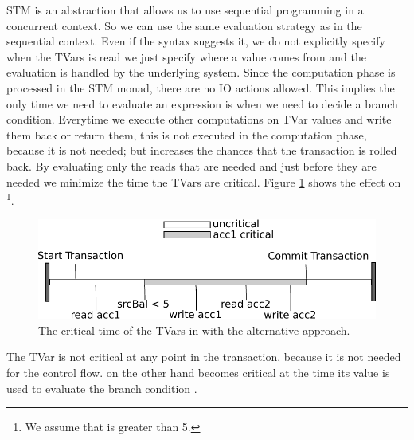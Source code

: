 STM is an abstraction that allows us to use sequential programming in a concurrent context. So we can use the 
same evaluation strategy as in the sequential context. Even if the syntax suggests it, we do not explicitly
specify when the TVars is read we just specify where a value comes from and the evaluation is handled by the 
underlying system. Since the computation phase is processed in the STM monad, there are no IO actions allowed.  
This implies the only time we need to evaluate an expression is when we need to decide a branch condition. 
Everytime we execute other computations on TVar values and write them back or return them, this is not executed 
in the computation phase, because it is not needed; but increases the chances that the transaction is rolled back. 
By evaluating only the reads that are needed and just before they are needed we minimize the time the TVars are critical. 
Figure \ref{fig:lessCriticalValue} shows the effect on \footnote{We 
assume that  is greater than 5.}. 
\begin{figure}
\centering
\includegraphics{Figures/lessCriticalValue}
\decoRule
\caption[lessCriticalValue]{The critical time of the TVars in  with the alternative approach.}
\label{fig:lessCriticalValue}
\end{figure}
The TVar  is not critical at any point in the transaction, because it is not needed for the control 
flow.  on the other hand becomes critical at the time its value is used to evaluate the branch
condition .

